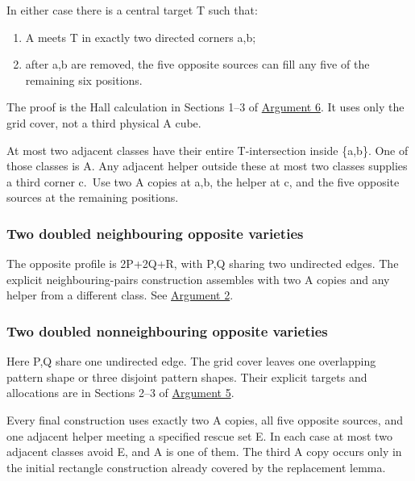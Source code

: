 \documentclass[
  10pt,
]{article}
\providecommand{\tightlist}{%
  \setlength{\itemsep}{0pt}\setlength{\parskip}{0pt}}
\begin{document}
In either case there is a central target T such that:

\begin{enumerate}
\def\labelenumi{\arabic{enumi}.}
\tightlist
\item
  A meets T in exactly two directed corners a,b;
\item
  after a,b are removed, the five opposite sources can fill any five of
  the remaining six positions.
\end{enumerate}

The proof is the Hall calculation in Sections 1--3 of
\protect\hyperlink{arg-6}{Argument 6}. It uses only the grid cover, not
a third physical A cube.

At most two adjacent classes have their entire T-intersection inside
\{a,b\}. One of those classes is A. Any adjacent helper outside these at
most two classes supplies a third corner c.~Use two A copies at a,b, the
helper at c, and the five opposite sources at the remaining positions.

\hypertarget{two-doubled-neighbouring-opposite-varieties}{%
\subsubsection*{Two doubled neighbouring opposite
varieties}\label{two-doubled-neighbouring-opposite-varieties}}

The opposite profile is 2P+2Q+R, with P,Q sharing two undirected edges.
The explicit neighbouring-pairs construction assembles with two A copies
and any helper from a different class. See
\protect\hyperlink{arg-2}{Argument 2}.

\hypertarget{two-doubled-nonneighbouring-opposite-varieties}{%
\subsubsection*{Two doubled nonneighbouring opposite
varieties}\label{two-doubled-nonneighbouring-opposite-varieties}}

Here P,Q share one undirected edge. The grid cover leaves one
overlapping pattern shape or three disjoint pattern shapes. Their
explicit targets and allocations are in Sections 2--3 of
\protect\hyperlink{arg-5}{Argument 5}.

Every final construction uses exactly two A copies, all five opposite
sources, and one adjacent helper meeting a specified rescue set E. In
each case at most two adjacent classes avoid E, and A is one of them.
The third A copy occurs only in the initial rectangle construction
already covered by the replacement lemma.
\end{document}
